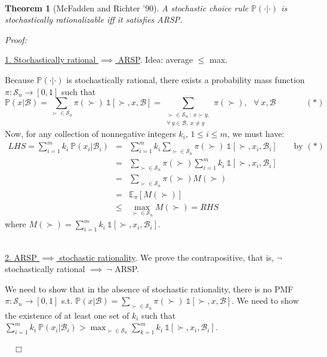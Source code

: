 \documentclass[11pt]{article}
\newtheorem{theorem}{Theorem}
\newcommand{\B}{\mathcal{B}}
\renewcommand{\S}{\mathcal{S}}
\newenvironment{proof}{\noindent\emph{Proof:}}{$\quad \Box$}
\begin{document}
~

\begin{theorem} [McFadden and Richter '90] A stochastic choice rule $\mathbb{P}(\cdot | \cdot)$ is stochastically rationalizable iff it satisfies ARSP.
\end{theorem}

\begin{proof}

\underline{1. Stochastically rational $\implies$ ARSP}. 
Idea: average $\leq$ max. 

Because $\mathbb{P}(\cdot | \cdot)$ is stochastically rational, there exists a probability mass function 
$ \pi: \S_n \rightarrow [0,1]$ such that 
$$\mathbb{P}(x|\B) = \sum_{\succ \in \S_n} \pi(\succ)~\mathds{1}[\succ, x, \B] = \sum_{\substack{\succ \in \S_n~:~ x\succ y, \\    \forall~ y \in \B, ~ x\neq y}} \pi(\succ),~~~\forall~x, \B~~~~~~~~~~~~~~~~(*)$$
Now, for any collection of nonnegative integers $k_i$, $1 \leq i \leq m$, we must have:
\begin{eqnarray*}
LHS = \sum^m_{i=1} k_i ~\mathbb{P}(x_i | \B_i) 
&=& \sum^m_{i=1}k_i \sum_{\succ \in \S_n} \pi(\succ)~\mathds{1}[\succ, x_i, \B_i] ~~~~~~~~~\text{by $(*)$}\\
&=& \sum_{\succ \in \S_n} \pi(\succ) \sum^m_{i=1}k_i ~\mathds{1}[\succ, x_i, \B_i]\\
&=& \sum_{\succ \in \S_n} \pi(\succ) M(\succ) \\
&=& \mathbb{E}_\pi [M(\succ)] \\
&\leq& \max_{\succ \in \S_n} M(\succ)  = RHS
\end{eqnarray*}
where $M(\succ) = \sum^m_{i=1}k_i ~\mathds{1}[\succ, x_i, \B_i]$. \\

~

\underline{2. ARSP $\implies$ stochastic rationality}. We prove the contrapositive, that is, $\neg$ stochastically rational $\implies~ \neg$ ARSP. 

We need to show that in the absence of stochastic rationality, there is no PMF $\pi: \S_n \rightarrow [0,1]$ s.t. $\mathbb{P}(x|\B) = \sum_{\succ \in \S_n} \pi(\succ)~\mathds{1}[\succ, x, \B]$. We need to show the existence of at least one set of $k_i$ such that $\sum^m_{i=1} k_i ~\mathbb{P}(x_i|\B_i) > \max_{\succ \in \S_n} \sum^m_{k=1} k_i ~\mathds{1}[\succ, x_i, \B_i]$. 



\end{proof}
\end{document}
